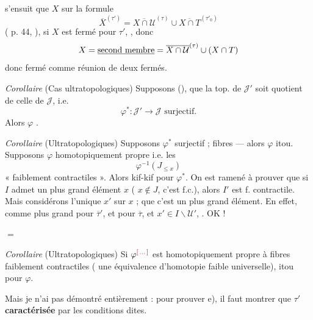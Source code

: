 \documentclass[11pt,a4paper]{article}
\begin{document}
 s'ensuit que $X$  \ill{} sur la formule
\[
  \overline{X}^{(\tau')} = \overline{X \cap \mathcal{U}}^{(\tau)} \cup \overline{X \cap T}^{(\tau'_0)}
\]
( p. 44, ), si $X$ est fermé pour $\tau'$,  , donc
\[
  X = \uncertain{\text{second membre}} = \overline{X \cap \mathcal{U}}^{(\tau)} \cup (X \cap T)
\]
donc fermé comme réunion de deux fermés.

\emph{Corollaire} (Cas ultratopologiques) Supposons (\ill{}), que la top. de $\mathcal{J}'$ soit quotient de celle de $\mathcal{J}$,  i.e.
\[
  \varphi^* : \mathcal{J}' \to \mathcal{J} \text{ surjectif.}
\]
Alors $\varphi$ \ill{}.

\emph{Corollaire} (Ultratopologiques) Supposons $\varphi^*$ surjectif ; fibres  — alors $\varphi$ itou. Supposons $\varphi$ \struck{\ill{}} homotopiquement propre i.e. les
\[
  \varphi^{-1}(J_{\leq x})
\]
« faiblement contractiles ». Alors kif-kif pour $\varphi^*$.  On est ramené à prouver que si $I$ admet un plus grand élément $x$ ( $x \notin J$,  c'est f.c.), alors $I'$ est f. contractile. Mais considérons l'unique  $x'$  sur $x$ ;  que c'est un plus grand élément. En effet, comme \ill{} plus grand \ill{} pour $\overline{\tau}'$, et pour $\overline{\tau}$, et $x' \in I \smallsetminus \mathcal{U}'$, \ill{} \ill{}  \ill{}. OK !

\ill{} $=$

\emph{Corollaire} (Ultratopologiques) Si $\varphi^{\ill{}}$ est homotopiquement propre à fibres \struck{\ill{}} faiblement contractiles ( une équivalence d'homotopie faible universelle), itou pour $\varphi$.

Mais je n'ai pas démontré entièrement : pour prouver e), il faut montrer que $\tau'$   \textbf{caractérisée} par les conditions dites.
\end{document}
